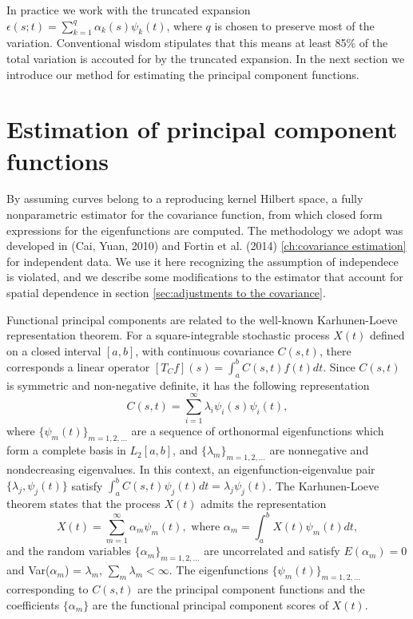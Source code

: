 In practice we work with the truncated expansion $\epsilon(s;t) = \sum_{k=1}^{q} \alpha_k(s)\psi_k(t)$, where $q$ is chosen to preserve most of the variation. Conventional wisdom stipulates that this means at least 85\% of the total variation is accouted for by the truncated expansion. In the next section we introduce our method for estimating the principal component functions.


\section{Estimation of principal component functions} %
\label{sec:eigenfunction_estimation}
 By assuming curves belong to a reproducing kernel Hilbert space, a fully nonparametric estimator for the covariance function, from which closed form expressions for the eigenfunctions are computed. The methodology we adopt was developed in (Cai, Yuan, 2010) and Fortin et al. (2014) \ref{ch:covariance estimation} for independent data. We use it here recognizing the assumption of independece is violated, and we describe some modifications to the estimator that account for spatial dependence in section \ref{sec:adjustments to the covariance}.
 
 Functional principal components are related to the well-known Karhunen-Loeve representation theorem.  For a square-integrable stochastic process $X(t)$ defined on a closed interval $[a,b]$,  with continuous covariance $C(s,t)$, there corresponds a linear operator $[T_Cf](s) = \int_a^bC(s,t)f(t)dt$. Since $C(s,t)$ is symmetric and non-negative definite, it has the following representation %
 \begin{equation*} 
  C(s,t) = \sum_{i=1}^{\infty}\lambda_i\psi_i(s)\psi_i(t),
 \end{equation*}
 where  $\{\psi_m(t)\}_{m=1,2,\ldots}$ are a sequence of orthonormal eigenfunctions which form a complete basis in $L_2[a,b]$, and  $\{\lambda_m \}_{m=1,2,\ldots}$ are nonnegative and nondecreasing eigenvalues. In this context, an eigenfunction-eigenvalue pair $\{\lambda_j, \psi_j(t)\}$ satisfy $\int_a^bC(s,t)\psi_j(t)dt = \lambda_j\psi_j(t)$. The Karhunen-Loeve theorem states that the process $X(t)$ admits the representation
 \begin{equation*}
 X(t) =  \sum_{m=1}^{\infty}\alpha_m \psi_m(t), \mbox{ where  } \alpha_m = \int_a^b X(t) \psi_m(t)dt,
 \end{equation*}
 and the random variables $\{\alpha_m \}_{m=1,2,\ldots}$ are uncorrelated and satisfy $E(\alpha_m)=0$ and Var($\alpha_m$) = $\lambda_m$, $\sum_m \lambda_m < \infty$. The eigenfunctions $\{\psi_m(t)\}_{m=1,2,\ldots}$ corresponding to $C(s,t)$ are the principal component functions and the coefficients  $\{\alpha_m \}$ are the functional principal component scores of $X(t)$.
 
